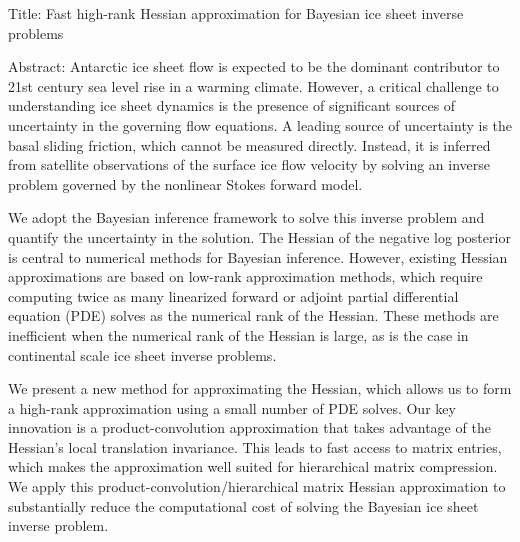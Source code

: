 Title: 
Fast high-rank Hessian approximation for Bayesian ice sheet inverse problems

Abstract:
Antarctic ice sheet flow is expected to be the dominant contributor to 21st century sea level rise in a warming climate. However, a critical challenge to understanding ice sheet dynamics is the presence of significant sources of uncertainty in the governing flow equations. A leading source of uncertainty is the basal sliding friction, which cannot be measured directly. Instead, it is inferred from satellite observations of the surface ice flow velocity by solving an inverse problem governed by the nonlinear Stokes forward model.

We adopt the Bayesian inference framework to solve this inverse problem and quantify the uncertainty in the solution. The Hessian of the negative log posterior is central to numerical methods for Bayesian inference. However, existing Hessian approximations are based on low-rank approximation methods, which require computing twice as many linearized forward or adjoint partial differential equation (PDE) solves as the numerical rank of the Hessian. These methods are inefficient when the numerical rank of the Hessian is large, as is the case in continental scale ice sheet inverse problems. 

We present a new method for approximating the Hessian, which allows us to form a high-rank approximation using a small number of PDE solves. Our key innovation is a product-convolution approximation that takes advantage of the Hessian's local translation invariance. This leads to fast access to matrix entries, which makes the approximation well suited for hierarchical matrix compression. We apply this product-convolution/hierarchical matrix Hessian approximation to substantially reduce the computational cost of solving the Bayesian ice sheet inverse problem.
